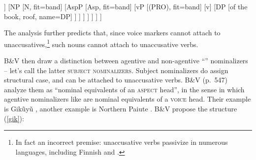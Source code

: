 \documentclass[output=paper,
modfonts
]{LSP/langsci}
\newcommand{\rf}[1]{(\ref{#1})}
\begin{document}
\begin{exe}
	\ex\label{agnoma}\begin{forest}
			[DP
				[D
					[the]
				]
				[NP
					[N, fit=band]
					[AspP
						[Asp, fit=band]
						[vP
							[(PRO), fit=band]
							[v\1
								[-er, fit=band, name=v]
								[VP
									[V
										[read]
									]
									[DP
										[of the book, roof, name=DP]
									]
			]
			]
			]
			]
			]
			]
		\end{forest}
\end{exe}
The analysis further predicts that, since voice markers cannot attach to
unaccusatives,\footnote{In fact an incorrect premise:  unaccusative verbs passivize in numerous
  languages, including Finnish and  \citep{kiparsky2013}.} such  nouns cannot attach to
unaccusative verbs.

B\&V then draw a distinction between agentive and non-agentive ``'' nominalizers –
let's call the latter \textsc{subject nominalizers}. Subject nominalizers do assign structural
case, and can be attached to unaccusative verbs.  B\&V (p.\ 547) analyze them as ``nominal
equivalents of an \textsc{aspect} head'', in the sense in which agentive nominalizers like
 are nominal equivalents of a \textsc{voice} head.  Their example is Gikũyũ
, another example is Northern Paiute  \citep{toosarvandani2014}.  B\&V propose
the structure \rf{gik}:
\end{document}
